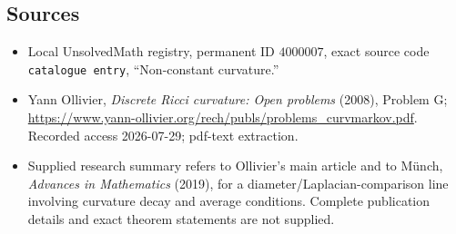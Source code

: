 \documentclass[11pt]{article}
\begin{document}
\subsection{Sources}
\begin{itemize}
\item Local UnsolvedMath registry, permanent ID \(4000007\), exact source code \texttt{catalogue entry}, ``Non-constant curvature.''
\item Yann Ollivier, \emph{Discrete Ricci curvature: Open problems} (2008), Problem G; \url{https://www.yann-ollivier.org/rech/publs/problems_curvmarkov.pdf}. Recorded access 2026-07-29; pdf-text extraction.
\item Supplied research summary refers to Ollivier's main article and to Münch, \emph{Advances in Mathematics} (2019), for a diameter/Laplacian-comparison line involving curvature decay and average conditions. Complete publication details and exact theorem statements are not supplied.
\end{itemize}
\end{document}
